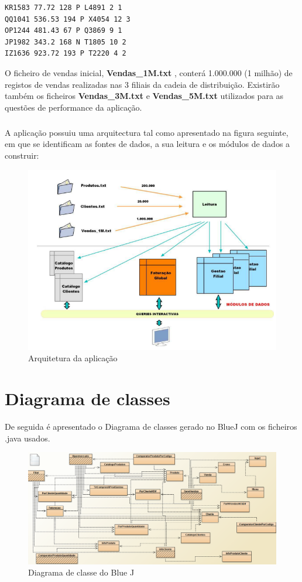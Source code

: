  \begin{Verbatim}
KR1583 77.72 128 P L4891 2 1
QQ1041 536.53 194 P X4054 12 3
OP1244 481.43 67 P Q3869 9 1
JP1982 343.2 168 N T1805 10 2
IZ1636 923.72 193 P T2220 4 2 
 \end{Verbatim}
 
O ficheiro de vendas inicial, \textbf{Vendas\_1M.txt} , conterá 1.000.000 (1 milhão) de registos de vendas realizadas nas 3 filiais da cadeia de distribuição. Existirão também os ficheiros  \textbf{Vendas\_3M.txt} e  \textbf{Vendas\_5M.txt} utilizados para as questões de performance da aplicação. 

\newpage 
\paragraph{}
A aplicação possuiu uma arquitectura tal como apresentado na figura seguinte, em que se identificam as fontes de dados, a sua leitura e os módulos de dados a construir: 

\begin{figure}[h!]
	\includegraphics[scale=0.8]{arquiteturaproj.png}  
	\caption{Arquitetura da aplicação}  
\end{figure}


\chapter{Diagrama de classes}
De seguida é apresentado o Diagrama de classes gerado no BlueJ com os ficheiros .java usados. 

\begin{figure}[h!]
	\includegraphics[scale=0.55]{diagramaclasses.png}  
	\caption{Diagrama de classe do Blue J }  
\end{figure}

